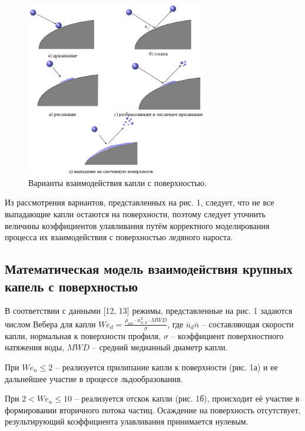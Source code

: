 \documentclass{psta}%
\begin{document}
\begin{figure}[ht]
\centering
\includegraphics[width=0.7\textwidth]{pics/sld_with_surf_interact.png}
\caption{Варианты взаимодействия капли с поверхностью.}
\label{fig:sld_with_surf_interact}
\end{figure}

Из рассмотрения вариантов, представленных на рис. 1, следует, что не все выпадающие капли остаются на поверхности, поэтому следует уточнить величины коэффициентов улавливания путём корректного моделирования процесса их взаимодействия с поверхностью ледяного нароста. 

\subsection{Математическая модель взаимодействия крупных капель с поверхностью}

В соответствии с данными [12, 13] режимы, представленные на рис. 1 задаются числом Вебера для капли $We_d = \frac{\rho_{air} \cdot u_{n,0}^2 \cdot MWD}{\sigma}$, где $\overline{u}_d \overline{n}$ -- составляющая скорости капли, нормальная к поверхности профиля, $\sigma$ -- коэффициент поверхностного натяжения воды, $MWD$ -- средний медианный диаметр капли.

При $We_n \le 2$ -- реализуется прилипание капли к поверхности (рис. 1а) и ее дальнейшее участие в процессе льдообразования.
 
При $2 < We_n \le 10$ -- реализуется отскок капли (рис. 1б), происходит её участие в формировании вторичного потока частиц. Осаждение на поверхность отсутствует, результирующий коэффициента улавливания принимается нулевым.
\end{document}
